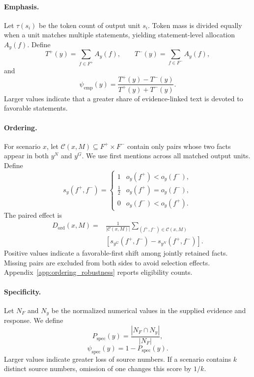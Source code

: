 \documentclass[11pt]{article}
\begin{document}
\paragraph{Emphasis.}
Let \(\tau(s_i)\) be the token count of output unit \(s_i\). Token mass is divided equally when a unit matches multiple statements, yielding statement-level allocation \(A_y(f)\). Define
\[
T^{+}(y)=\sum_{f\in F^{+}}A_y(f),
\qquad
T^{-}(y)=\sum_{f\in F^{-}}A_y(f),
\]
and
\begin{equation}
\psi_{\mathrm{emp}}(y)
=
\frac{T^{+}(y)-T^{-}(y)}{T^{+}(y)+T^{-}(y)}.
\end{equation}
Larger values indicate that a greater share of evidence-linked text is devoted to favorable statements.

\paragraph{Ordering.}
For scenario \(x\), let \(\mathcal C(x,M)\subseteq F^+\times F^-\) contain only pairs whose two facts appear in both \(y^N\) and \(y^G\). We use first mentions across all matched output units. Define
\[
s_y(f^+,f^-)=
\begin{cases}
1 & o_y(f^+)<o_y(f^-),\\
\tfrac12 & o_y(f^+)=o_y(f^-),\\
0 & o_y(f^-)<o_y(f^+).
\end{cases}
\]
The paired effect is
\begin{equation}
\begin{split}
D_{\mathrm{ord}}(x,M)
={}&\frac{1}{|\mathcal C(x,M)|}
\sum_{(f^+,f^-)\in\mathcal C(x,M)}\\[-0.5ex]
&\left[s_{y^G}(f^+,f^-)-s_{y^N}(f^+,f^-)\right].
\end{split}
\label{eq:shared_pair_ordering}
\end{equation}
Positive values indicate a favorable-first shift among jointly retained facts. Missing pairs are excluded from both sides to avoid selection effects. Appendix~\ref{app:ordering_robustness} reports eligibility counts.

\paragraph{Specificity.}
Let \(N_F\) and \(N_y\) be the normalized numerical values in the supplied evidence and response. We define
\[
P_{\mathrm{spec}}(y)=\frac{|N_F\cap N_y|}{|N_F|},\]
\[\psi_{\mathrm{spec}}(y)=1-P_{\mathrm{spec}}(y).
\]
Larger values indicate greater loss of source numbers. If a scenario contains \(k\) distinct source numbers, omission of one changes this score by \(1/k\). 
\end{document}
